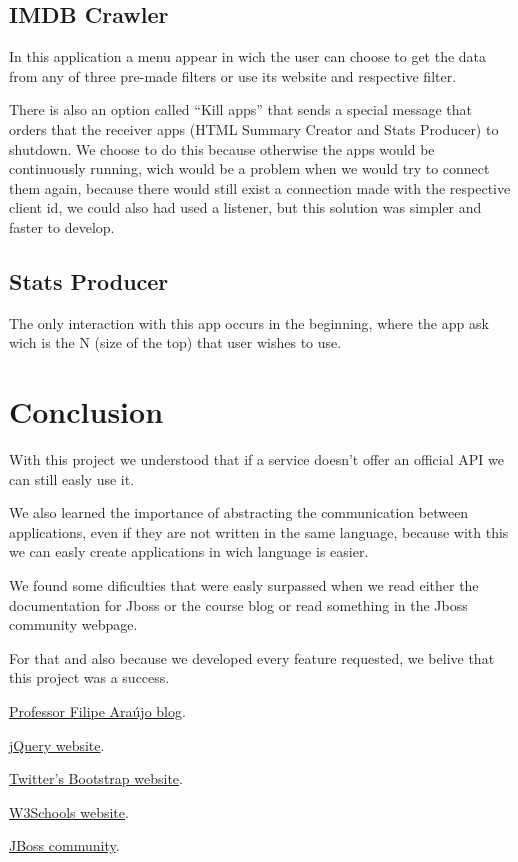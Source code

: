 \documentclass[a4paper]{article}
\begin{document}
\subsection{IMDB Crawler}
\indent \indent In this application a menu appear in wich the user can choose to get the data from any of three pre-made filters or use its website and respective filter.

There is also an option called ``Kill apps'' that sends a special message that orders that the receiver apps (HTML Summary Creator and Stats Producer) to shutdown. We choose to do this because otherwise the apps would be continuously running, wich would be a problem when we would try to connect them again, because there would still exist a connection made with the respective client id, we could also had used a listener, but this solution was simpler and faster to develop.

\subsection{Stats Producer}
\indent \indent The only interaction with this app occurs in the beginning, where the app ask wich is the N (size of the top) that user wishes to use.

\clearpage
\section{Conclusion}
\indent \indent With this project we understood that if a service doesn't offer an official API we can still easly use it.

We also learned the importance of abstracting the communication between applications, even if they are not written in the same language, because with this we can easly create applications in wich language is easier.

We found some dificulties that were easly surpassed when we read either the documentation for Jboss or the course blog or read something in the Jboss community webpage.

For that and also because we developed every feature requested, we belive that this project was a success.

\clearpage
\begin{thebibliography}{9}
	\href{http://eai-course.blogspot.pt/}{Professor Filipe Araújo blog}.

	\href{http://jquery.com/}{jQuery website}.

	\href{http://getbootstrap.com/}{Twitter's Bootstrap website}.

	\href{http://www.w3schools.com/}{W3Schools website}.
	
	\href{https://community.jboss.org/}{JBoss community}.
\end{thebibliography}
\end{document}
